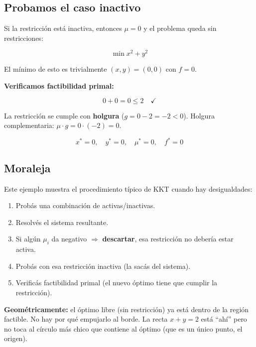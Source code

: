 \documentclass[12pt]{article}
\begin{document}
\subsection{Probamos el caso inactivo}

Si la restricción está inactiva, entonces $\mu = 0$ y el problema queda sin restricciones:

\[
\min x^2 + y^2
\]

\vspace{0.3em}

El mínimo de esto es trivialmente $(x, y) = (0, 0)$ con $f = 0$.

\vspace{0.3em}

\textbf{Verificamos factibilidad primal:}

\[
0 + 0 = 0 \leq 2 \quad \checkmark
\]

\vspace{0.3em}

La restricción se cumple con \textbf{holgura} ($g = 0 - 2 = -2 < 0$). Holgura complementaria: $\mu \cdot g = 0 \cdot (-2) = 0$. \checkmark

\[
\boxed{x^* = 0, \quad y^* = 0, \quad \mu^* = 0, \quad f^* = 0}
\]

\subsection{Moraleja}

Este ejemplo muestra el procedimiento típico de KKT cuando hay desigualdades:

\begin{enumerate}
    \item Probás una combinación de activas/inactivas.
    \item Resolvés el sistema resultante.
    \item Si algún $\mu_i$ da negativo $\Rightarrow$ \textbf{descartar}, esa restricción no debería estar activa.
    \item Probás con esa restricción inactiva (la sacás del sistema).
    \item Verificás factibilidad primal (el nuevo óptimo tiene que cumplir la restricción).
\end{enumerate}

\vspace{0.5em}

\textbf{Geométricamente:} el óptimo libre (sin restricción) ya está dentro de la región factible. No hay por qué empujarlo al borde. La recta $x + y = 2$ está ``ahí'' pero no toca al círculo más chico que contiene al óptimo (que es un único punto, el origen).
\end{document}
